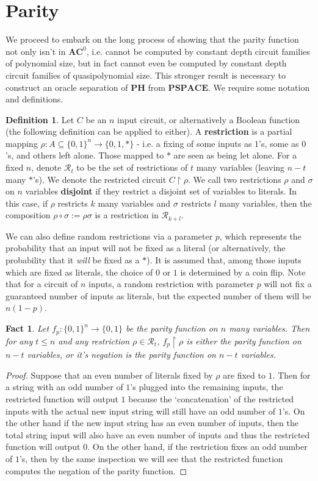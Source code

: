 \documentclass{article}
\theoremstyle{definition}
\newtheorem{definition}{Definition}[section]
\theoremstyle{plain}
\theoremstyle{theorem}
\newtheorem{fact}{Fact}[section]
\begin{document}
\section{Parity}
We proceed to embark on the long process of showing that the parity function not only isn't in $\bm{AC}^0$, i.e. cannot be computed by constant depth circuit families of polynomial size, but in fact cannot even be computed by constant depth circuit families of quasipolynomial size. This stronger result is necessary to construct an oracle separation of $\bm{PH}$ from $\bm{PSPACE}$. We require some notation and definitions.
\begin{definition}
	Let $C$ be an $n$ input circuit, or alternatively a Boolean function (the following definition can be applied to either). A \textbf{restriction} is a partial mapping $\rho: A \subseteq \{0,1\}^n \to \{0,1,*\}$ - i.e. a fixing of some inputs as $1$'s, some as $0$'s, and others left alone. Those mapped to $*$ are seen as being let alone. For a fixed $n$, denote $\mathcal{R}_t$ to be the set of restrictions of $t$ many variables (leaving $n-t$ many $*$'s). We denote the restricted circuit $C \restriction \rho$. We call two restrictions $\rho$ and $\sigma$ on $n$ variables \textbf{disjoint} if they restrict a disjoint set of variables to literals. In this case, if $\rho$ restricts $k$ many variables and $\sigma$ restricts $l$ many variables, then the composition $\rho \circ \sigma := \rho\sigma$ is a restriction in $\mathcal{R}_{k+l}$. \par 
	We can also define random restrictions via a parameter $p$, which represents the probability that an input will not be fixed as a literal (or alternatively, the probability that it \emph{will} be fixed as a $*$). It is assumed that, among those inputs which are fixed as literals, the choice of $0$ or $1$ is determined by a coin flip. Note that for a circuit of $n$ inputs, a random restriction with parameter $p$ will not fix a guaranteed number of inputs as literals, but the expected number of them will be $n(1-p)$. 
\end{definition}
\begin{fact}
	Let $f_p:\{0,1\}^n \to \{0,1\}$ be the parity function on $n$ many variables. Then for any $t \leq n$ and any restriction $\rho \in \mathcal{R}_t$, $f_p \restriction \rho$ is either the parity function on $n-t$ variables, or it's negation is the parity function on $n-t$ variables. 
\end{fact}
\begin{proof}
	Suppose that an even number of literals fixed by $\rho$ are fixed to $1$. Then for a string with an odd number of $1$'s plugged into the remaining inputs, the restricted function will output $1$ because the `concatenation' of the restricted inputs with the actual new input string will still have an odd number of $1$'s. On the other hand if the new input string has an even number of inputs, then the total string input will also have an even number of inputs and thus the restricted function will output $0$. 	On the other hand, if the restriction fixes an odd number of $1$'s, then by the same inspection we will see that the restricted function computes the negation of the parity function. \par 
\end{proof}
\end{document}
